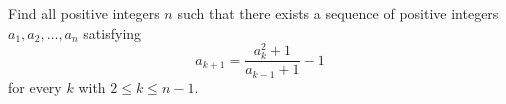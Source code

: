 Find all positive integers $n$ such that there exists a sequence of positive integers $a_1, a_2, \ldots, a_n$ satisfying
\[
a_{k+1} = \frac{a_k^2 + 1}{a_{k-1} + 1} - 1
\]
for every $k$ with $2 \leq k \leq n-1$.
